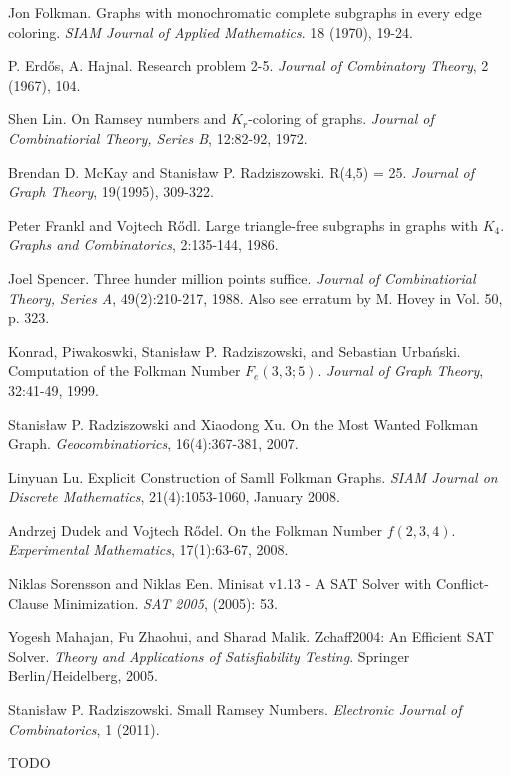 \documentclass[paper=a4, fontsize=11pt]{scrartcl} %
\begin{document}
\begin{thebibliography}{9}

 Jon Folkman. Graphs with monochromatic complete subgraphs in
every edge coloring. \emph{SIAM Journal of Applied Mathematics}. 18 (1970), 19-24.

 P. Erd\H os, A. Hajnal. Research problem 2-5. \emph{Journal of Combinatory Theory}, 
2 (1967), 104.

 Shen Lin. On Ramsey numbers and $K_r$-coloring of graphs. \emph{Journal of
Combinatiorial Theory, Series B}, 12:82-92, 1972.

 Brendan D. McKay and Stanis{\l}aw P. Radziszowski. R(4,5) = 25. \emph{Journal
of Graph Theory}, 19(1995), 309-322.

 Peter Frankl and Vojtech R\H odl. Large triangle-free subgraphs
in graphs with $K_4$. \emph{Graphs and Combinatorics}, 2:135-144, 1986.

 Joel Spencer. Three hunder million points suffice. \emph{Journal of
Combinatiorial Theory, Series A}, 49(2):210-217, 1988. Also see erratum by M. Hovey in
Vol. 50, p. 323.

 Konrad, Piwakoswki, Stanis{\l}aw P. Radziszowski, and Sebastian
Urba\'nski. Computation of the Folkman Number $F_e(3,3;5)$. \emph{Journal of Graph
Theory}, 32:41-49, 1999.

 Stanis{\l}aw P. Radziszowski and Xiaodong Xu. On the Most Wanted
Folkman Graph. \emph{Geocombinatiorics}, 16(4):367-381, 2007.

 Linyuan Lu. Explicit Construction of Samll Folkman Graphs. \emph{SIAM Journal
on Discrete Mathematics}, 21(4):1053-1060, January 2008.

 Andrzej Dudek and Vojtech R\H odel. On the Folkman Number $f(2,3,4)$.
\emph{Experimental Mathematics}, 17(1):63-67, 2008.

 Niklas Sorensson and Niklas Een. Minisat v1.13 - A SAT Solver with Conflict-Clause Minimization. \emph{SAT 2005}, (2005): 53.

 Yogesh Mahajan, Fu Zhaohui, and Sharad Malik. Zchaff2004: An Efficient SAT Solver. \emph{Theory and Applications of Satisfiability Testing}. Springer Berlin/Heidelberg, 2005.

 Stanis{\l}aw P. Radziszowski. Small Ramsey Numbers. \emph{Electronic Journal of Combinatorics}, 1 (2011).

 TODO

\end{thebibliography}
\end{document}
